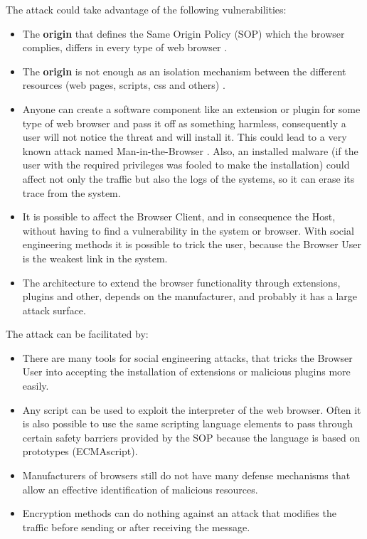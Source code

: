 \documentclass{sig-alternate-05-2015}
\begin{document}
The attack could take advantage of the following vulnerabilities:
\begin{itemize}
  \item The \textbf{origin} that defines the Same Origin Policy (SOP) which the browser complies, differs in every type of web browser \cite{W3C-SOP,Reis2009, Jackson2008, Crowley2010, Paola2006}.
  \item The \textbf{origin} is not enough as an isolation mechanism between the different resources (web pages, scripts, css and others) \cite{Silic2010, Barth2009, Yason, Liu2012}.
  \item Anyone can create a software component like an extension or plugin for some type of web browser and pass it off as something harmless, consequently a user will not notice the threat and will install it. This could lead to a very known attack named Man-in-the-Browser \cite{Dougan2012,Utakrit2009,Liu2012,Barth2010}. Also, an installed malware (if the user with the required privileges was fooled to make the installation) could affect not only the traffic but also the logs of the systems, so it can erase its trace from the system.
  \item It is possible to affect the Browser Client, and in consequence the Host, without having to find a vulnerability in the system or browser. With social engineering methods it is possible to trick the user, because the Browser User is the weakest link in the system.
  \item The architecture to extend the browser functionality through extensions, plugins and other, depends on the manufacturer, and probably it has a large attack surface.
\end{itemize}

The attack can be facilitated by:
\begin{itemize}
  \item There are many tools for social engineering attacks, that tricks the Browser User into accepting the installation of extensions or malicious plugins more easily.
  \item Any script can be used to exploit the interpreter of the web browser. Often it is also possible to use the same scripting language elements to pass through certain safety barriers provided by the SOP because the language is based on prototypes (ECMAscript).
  \item Manufacturers of browsers still do not have many defense mechanisms that allow an effective identification of malicious resources.
  \item Encryption methods can do nothing against an attack that modifies the traffic before sending or after receiving the message.
\end{itemize}
\end{document}
